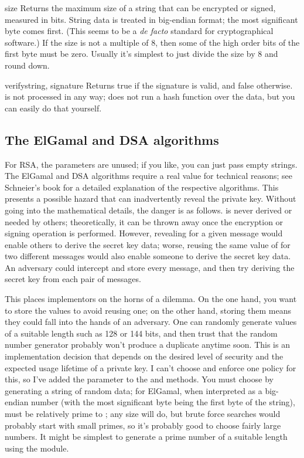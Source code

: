 \documentclass{howto}
\begin{document}
\begin{methoddesc}{size}{}
Returns the maximum size of a string that can be encrypted or signed,
measured in bits.  String data is treated in big-endian format; the most
significant byte comes first.  (This seems to be a \emph{de facto} standard
for cryptographical software.)  If the size is not a multiple of 8, then
some of the high order bits of the first byte must be zero.  Usually
it's simplest to just divide the size by 8 and round down.
\end{methoddesc}

\begin{methoddesc}{verify}{string, signature}
Returns true if the signature is valid, and false otherwise.
 is not processed in any way;  does
not run a hash function over the data, but you can easily do that yourself.
\end{methoddesc}

\subsection{The ElGamal and DSA algorithms}
For RSA, the  parameters are unused; if you like, you can just
pass empty strings.  The ElGamal and DSA algorithms require a real
 value for technical reasons; see Schneier's book for a detailed
explanation of the respective algorithms.  This presents a possible
hazard that can
inadvertently reveal the private key.  Without going into the
mathematical details, the danger is as follows.  is never derived
or needed by others; theoretically, it can be thrown away once the
encryption or signing operation is performed.  However, revealing
 for a given message would enable others to derive the secret key
data; worse, reusing the same value of  for two different
messages would also enable someone to derive the secret key data.  An
adversary could intercept and store every message, and then try deriving
the secret key from each pair of messages.

This places implementors on the horns of a dilemma.  On the one hand,
you want to store the  values to avoid reusing one; on the other
hand, storing them means they could fall into the hands of an adversary.
One can randomly generate  values of a suitable length such as
128 or 144 bits, and then trust that the random number generator
probably won't produce a duplicate anytime soon.  This is an
implementation decision that depends on the desired level of security
and the expected usage lifetime of a private key.  I can't choose and
enforce one policy for this, so I've added the  parameter to the
 and  methods.  You must choose  by
generating a string of random data; for ElGamal, when interpreted as a
big-endian number (with the most significant byte being the first byte
of the string),  must be relatively prime to ; any
size will do, but brute force searches would probably start with small
primes, so it's probably good to choose fairly large numbers.  It might be
simplest to generate a prime number of a suitable length using the
 module.
\end{document}

